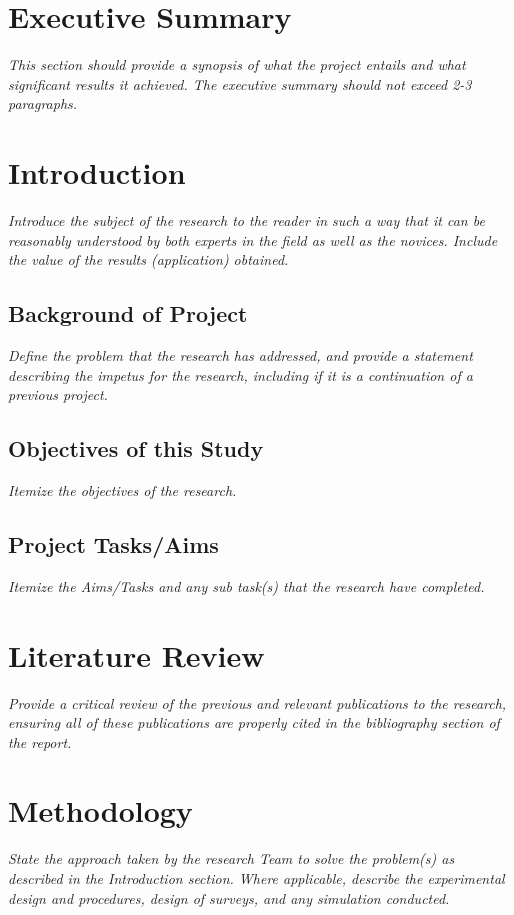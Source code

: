 \documentclass[11pt,letterpaper]{article}
\begin{document}
\newpage
\section*{Executive Summary}
\textit{This section should provide a synopsis of what the project entails and what significant results it achieved. The executive summary should not exceed 2-3 paragraphs.}

\newpage
\section{Introduction}
\textit{Introduce the subject of the research to the reader in such a way that it can be reasonably understood by both experts in the field as well as the novices. Include the value of the results (application) obtained.}

\subsection{Background of Project}
\textit{Define the problem that the research has addressed, and provide a statement describing the impetus for the research, including if it is a continuation of a previous project. }

\subsection{Objectives of this Study}
\textit{Itemize the objectives of the research. }

\subsection{Project Tasks/Aims}
\textit{Itemize the Aims/Tasks and any sub task(s) that the research have completed.}

\newpage
\section{Literature Review}
\textit{Provide a critical review of the previous and relevant publications to the research, ensuring all of these publications are properly cited in the bibliography section of the report.}

\newpage
\section{Methodology}
\textit{State the approach taken by the research Team to solve the problem(s) as described in the Introduction section. Where applicable, describe the experimental design and procedures, design of surveys, and any simulation conducted.}
\end{document}
